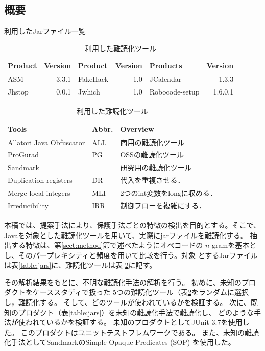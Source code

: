 \documentclass[a4j,fleqn,10pt]{jarticle}
\begin{document}
\subsection{概要}

\begin{table}[t]
  \centering
  \footnotesize{
    \caption{利用したJarファイル一覧}\label{table:jars}
  \begin{tabular}{l|r||l|r||l|r}
    Product & Version & Product & Version & Products & Version \\ \hline
    ASM       & 3.3.1 & FakeHack  & 1.0 &JCalendar & 1.3.3   \\
    Jhstop    & 0.0.1 & Jwhich    & 1.0   & Robocode-setup & 1.6.0.1 
  \end{tabular}
  \caption{利用した難読化ツール}\label{table:tools}
  \begin{tabular}{ll|l}
      Tools & Abbr. & Overview \\ \hline
      Allatori Java Obfuscator & ALL & 商用の難読化ツール \\ \hline
      ProGurad                 & PG & OSSの難読化ツール \\ \hline
      Sandmark                 & & 研究用の難読化ツール \\
      \hspace{0.2cm} Duplication registers & DR & 代入を重複させる．\\
      \hspace{0.2cm} Merge local integers & MLI & 2つのint変数をlongに収める．\\
      \hspace{0.2cm} Irreducibility       & IRR & 制御フローを複雑にする．\\
  \end{tabular}}
\end{table}

本稿では、提案手法により、保護手法ごとの特徴の検出を目的とする。そこで、
Javaを対象とした難読化ツールを用いて、実際にjarファイルを難読化する。
抽出する特徴は、第\ref{sect:method}節で述べたようにオペコードの
$n$-gramを基本とし、そのパープレキシティと頻度を用いて比較を行う。対象
とするJarファイルは表\ref{table:jars}に、難読化ツールは表
\ref{table:tools}に記す。

その解析結果をもとに、不明な難読化手法の解析を行う。
初めに、未知のプロダクトをケーススタディで扱った
5つの難読化ツール（表\ref{table:tools}をランダムに選択し，難読化する。
そして、どのツールが使われているかを検証する。
次に、既知のプロダクト（表\ref{table:jars}）を未知の難読化手法で難読化し、
どのような手法が使われているかを検証する。
未知のプロダクトとしてJUnit 3.7を使用した。
このプロダクトはユニットテストフレムワークである。
また、未知の難読化手法としてSandmarkのSimple Opaque Predicates (SOP) を使用した。
\end{document}
